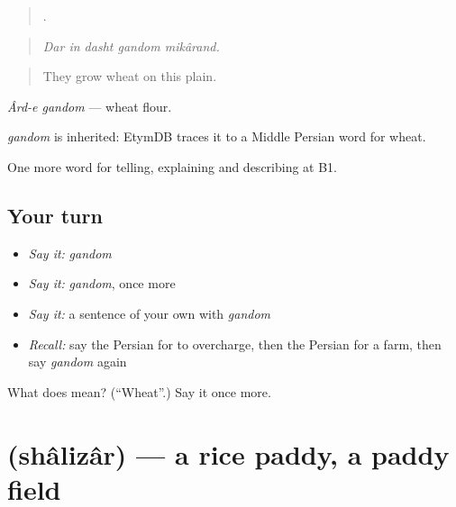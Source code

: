 \begin{quote}
    .
\end{quote}

\begin{quote}
\emph{Dar in dasht gandom mikârand.}
\end{quote}

\begin{quote}
They grow wheat on this plain.
\end{quote}

\emph{Ârd-e gandom} — wheat flour.

\begin{cousinweb}
\emph{gandom} is inherited: EtymDB traces it to a Middle Persian word for wheat.
\end{cousinweb}

\begin{grammarlens}[title={What you've built}]
One more word for telling, explaining and describing at B1.
\end{grammarlens}

\subsection*{Your turn}
\begin{itemize}
\raggedright
  \item \emph{Say it:} \emph{gandom}
  \item \emph{Say it:} \emph{gandom}, once more
  \item \emph{Say it:} a sentence of your own with \emph{gandom}
  \item \emph{Recall:} say the Persian for to overcharge, then the Persian for a farm, then say \emph{gandom} again
\end{itemize}

\begin{tcolorbox}[breakable,colback=teal!4,colframe=teal!35!black,title={Before you move on}]
What does  mean? (\textquotedblleft{}Wheat\textquotedblright{}.) Say it once more.
\end{tcolorbox}
\section[\texorpdfstring{\fa{شالیزار} (shâlizâr)}{شالیزار (shâlizâr)}]{ (shâlizâr) — a rice paddy, a paddy field}

\label{lesson:FA-C465-shalizar}



